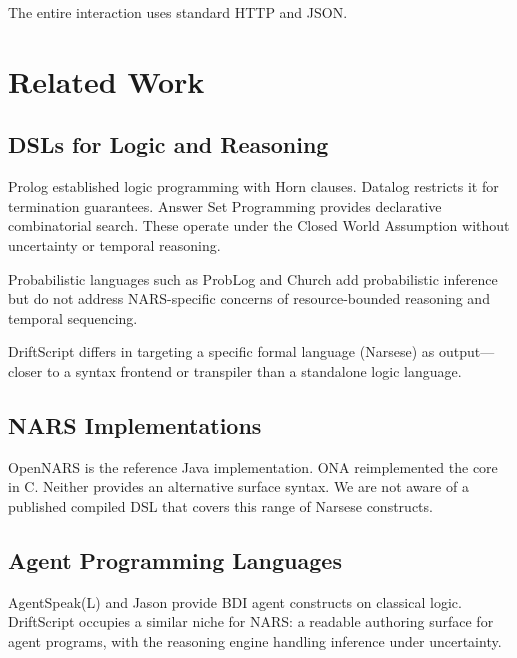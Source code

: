 \documentclass[11pt,a4paper]{article}
\begin{document}
The entire interaction uses standard HTTP and JSON.

\section{Related Work}
\label{sec:related}

\subsection{DSLs for Logic and Reasoning}

Prolog \citep{clocksin2003programming} established logic programming with
Horn clauses. Datalog \citep{ceri1989datalog} restricts it for termination
guarantees. Answer Set Programming \citep{gebser2012answer} provides
declarative combinatorial search. These operate under the Closed World
Assumption without uncertainty or temporal reasoning.

Probabilistic languages such as ProbLog \citep{deraedt2007problog} and Church
\citep{goodman2008church} add probabilistic inference but do not address
NARS-specific concerns of resource-bounded reasoning and temporal sequencing.

DriftScript differs in targeting a specific formal language (Narsese) as
output---closer to a syntax frontend or transpiler than a standalone logic
language.

\subsection{NARS Implementations}

OpenNARS \citep{wang1995non} is the reference Java implementation. ONA
\citep{hammer2020opennars} reimplemented the core in C. Neither provides an
alternative surface syntax. We are not aware of a published compiled DSL
that covers this range of Narsese constructs.

\subsection{Agent Programming Languages}

AgentSpeak(L) \citep{rao1996agentspeak} and Jason \citep{bordini2007jason}
provide BDI agent constructs on classical logic. DriftScript occupies a
similar niche for NARS: a readable authoring surface for agent programs, with
the reasoning engine handling inference under uncertainty.
\end{document}

